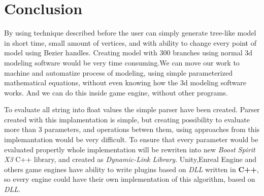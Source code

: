 \documentclass[b5paper,twoside,11pt]{article}
\begin{document}
 



\section{Conclusion}
By using technique described before the user can simply generate tree-like model in short time, small amount of vertices, and with ability to change every point of model using Bezier handles. Creating model with 300 branches using normal 3d modeling software would be very time consuming.We can move our work to machine and automatize process of modeling, using simple parameterized mathematical equations, without even knowing how the 3d modeling software works. And we can do this inside game engine, without other programs.

To evaluate all string into float values the simple parser have been created.
Parser created with this implamentation is simple, but creating possibility to evaluate more than 3 parameters, and operations betwen them, using approaches from this implemantation would be very difficult. To ensure that every parameter would be evaluated propertly whole implementation will be rewriten into new \textit{Boost Spirit X3} C++ library, and created as \textit{Dynamic-Link Library}. Unity,Enreal Engine and others game engines have ability to write plugins based on \textit{DLL} written in \textbf{C++}, so every engine could have their own implementation of this algorithm, based on \textit{DLL}.
\end{document}
